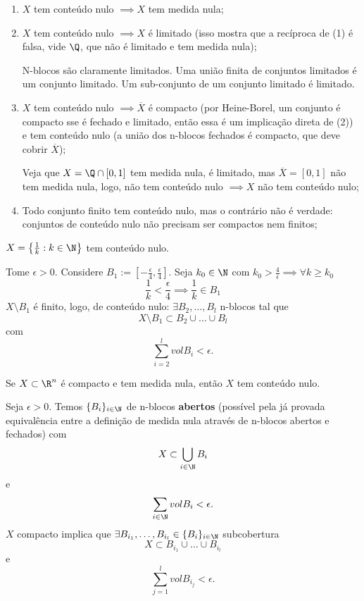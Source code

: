 \begin{remark}
    \begin{enumerate}
        \item $X$ tem conteúdo nulo $\implies X$ tem medida nula;
	\item $X$ tem conteúdo nulo $\implies X$ é limitado (isso mostra que a recíproca de (1) é falsa, vide $\Q$, que não é limitado e tem medida nula);

	    N-blocos são claramente limitados. Uma união finita de conjuntos limitados é um conjunto limitado. Um sub-conjunto de um conjunto limitado é limitado.

	\item $X$ tem conteúdo nulo $\implies \overline{X}$ é compacto (por Heine-Borel, um conjunto é compacto sse é fechado e limitado, então essa é um implicação direta de (2)) e tem conteúdo nulo (a união dos n-blocos fechados é compacto, que deve cobrir $\overline{X}$);

	    Veja que $X=\Q \cap \left[ 0,1 \right] $ tem medida nula, é limitado, mas $\overline{X} = \left[ 0,1 \right] $ não tem medida nula, logo, não tem conteúdo nulo $\implies X$ não tem conteúdo nulo;
	\item Todo conjunto finito tem conteúdo nulo, mas o contrário não é verdade: conjuntos de conteúdo nulo não precisam ser compactos nem finitos;
    \end{enumerate}
\end{remark}

\begin{eg}
    $X=\left\{ \frac{1}{k}:k\in \N \right\} $ tem conteúdo nulo.

    Tome $\epsilon > 0$. Considere $B_1:= \left[ -\frac{\epsilon}{4}, \frac{\epsilon}{4} \right] $. Seja $k_0 \in  \N$ com $k_0>\frac{4}{\epsilon} \implies \forall k\ge k_0$ \[
    \frac{1}{k} < \frac{\epsilon}{4} \implies \frac{1}{k} \in B_1
\] $X\setminus B_1$ é finito, logo, de conteúdo nulo: $\exists B_2,\ldots,B_l$ n-blocos tal que \[
X\setminus B_1 \subset  B_2 \cup \ldots\cup B_l
\] com \[
\sum_{i=2}^{l} vol B_i < \epsilon
.\]
\end{eg}

\begin{prop}
    Se $X\subset \R^{n}$ é compacto e tem medida nula, então $X$ tem conteúdo nulo.
\end{prop}

\begin{demo}
    Seja $\epsilon>0$. Temos $\{B_i\} _{i\in \N}$ de n-blocos \textbf{abertos} (possível pela já provada equivalência entre a definição de medida nula através de n-blocos abertos e fechados) com \[
    X \subset \bigcup_{i\in \N} B_i
    \] e \[
    \sum_{i\in \N} vol B_i < \epsilon
    .\] $X$ compacto implica que $\exists B_{i_1},\ldots,B_{i_l} \in \{B_i\} _{i\in \N}$ subcobertura \[
    X \subset B_{i_1} \cup \ldots\cup B_{i_l}
    \] e \[
    \sum_{j=1}^{l} vol B_{i_j} < \epsilon
    .\] 
\end{demo}

